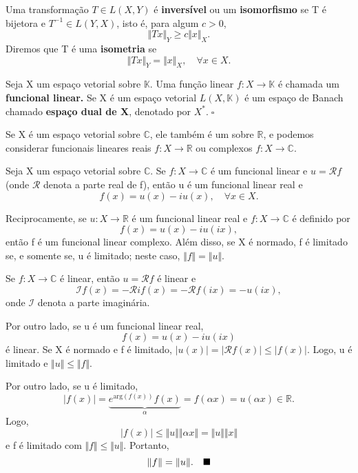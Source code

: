 \documentclass[../functional_analysis.tex]{subfiles}
\begin{document}
\begin{def*}
	Uma transformação \(T\in L(X, Y)\) é \textbf{inversível} ou um \textbf{isomorfismo} se T é bijetora e \(T^{-1}\in L(Y, X)\), isto é, para algum \(c>0\),
	\[
		\Vert Tx \Vert_{Y} \geq c \Vert x \Vert_{X}.
	\]
	Diremos que T é uma \textbf{isometria} se
	\[
		\Vert Tx \Vert_{Y} = \Vert x \Vert_{X},\quad \forall x\in X.
	\]
\end{def*}
\begin{def*}
	Seja X um espaço vetorial sobre \(\mathbb{K}.\) Uma função linear \(f:X\rightarrow \mathbb{K}\) é chamada um \textbf{funcional linear.}  Se X é um espaço vetorial \(L(X, \mathbb{K})\) é um espaço de Banach chamado \textbf{espaço dual de X}, denotado por \(X^{*}. \;\square\)
\end{def*}
\begin{tcolorbox}[
		skin=enhanced,
		title=Observação,
		fonttitle=\bfseries,
		colframe=black,
		colbacktitle=cyan!75!white,
		colback=cyan!15,
		colbacklower=black,
		coltitle=black,
		drop fuzzy shadow,
	]
	Se X é um espaço vetorial sobre \(\mathbb{C}\), ele também é um sobre \(\mathbb{R}\), e podemos considerar funcionais lineares reais \(f:X\rightarrow \mathbb{R}\) ou complexos \(f:X\rightarrow \mathbb{C}.\)
\end{tcolorbox}

\begin{prop*}
	Seja X um espaço vetorial sobre \(\mathbb{C}.\) Se \(f:X\rightarrow \mathbb{C}\) é um funcional linear e \(u= \mathcal{R}f\) (onde \(\mathcal{R}\) denota a parte real de f), então u é um funcional linear real e
	\[
		f(x)=u(x)-iu(x),\quad \forall x\in X.
	\]

	Reciprocamente, se \(u:X\rightarrow \mathbb{R}\) é um funcional linear real e \(f:X\rightarrow \mathbb{C}\) é definido por
	\[
		f(x)=u(x)-iu(ix),
	\]
	então f é um funcional linear complexo. Além disso, se X é normado, f é limitado se, e somente se, u é limitado; neste caso, \(\Vert f \Vert = \Vert u \Vert.\)
\end{prop*}
\begin{proof*}
	Se \(f:X\rightarrow \mathbb{C}\) é linear, então \(u=\mathcal{R}f\) é linear e
	\[
		\mathcal{I}f(x)=-\mathcal{R}if(x)=-\mathcal{R}f(ix)=-u(ix),
	\]
	onde \(\mathcal{I}\) denota a parte imaginária.

	Por outro lado, se u é um funcional linear real,
	\[
		f(x)=u(x)-iu(ix)
	\]
	é linear. Se X é normado e f é limitado, \(|u(x)|=|\mathcal{R}f(x)|\leq |f(x)|.\) Logo, u é limitado e \(\Vert u \Vert\leq \Vert f \Vert.\)

	Por outro lado, se u é limitado,
	\[
		|f(x)|=\underbrace{e^{\mathrm{arg}(f(x))}f(x)}_{\alpha }=f(\alpha x)=u(\alpha x)\in \mathbb{R}.
	\]
	Logo,
	\[
		|f(x)|\leq \Vert u \Vert \Vert \alpha x \Vert = \Vert u \Vert \Vert x \Vert
	\]
	e f é limitado com \(\Vert f \Vert\leq \Vert u \Vert.\) Portanto,
	\[
		\Vert f \Vert=\Vert u \Vert.\quad \text{$\blacksquare$}
	\]
\end{proof*}
\end{document}
